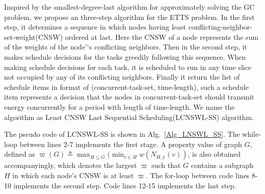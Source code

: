 \documentclass[journal,10pt]{IEEEtran}
\begin{document}
Inspired by the smallest-degree-last algorithm for approximately solving the GC problem, we propose an three-step algorithm for the ETTS problem. In the first step, it determines a sequence in which nodes having least conflicting-neighbor-set-weight(CNSW) ordered at last. Here the CNSW of a node represents the sum of the weights of the node'`s conflicting neighbors. Then in the second step, it makes schedule decisions for the tasks greedily following this sequence. When making schedule decisions for each task, it is scheduled to run in any time slice not occupied by any of its conflicting neighbors. Finally it return the list of schedule items in format of (concurrent-task-set, time-length), such a schedule item represents a decision that the nodes in concurrent-task-set should transmit energy concurrently for a period with length  of time-length. We name the algorithm as Least CNSW Last Sequential Scheduling(LCNSWL-SS) algorithm.

The pseudo code of LCNSWL-SS is shown in Alg.~\ref{Alg_LNSWL_SS}. The while-loop between lines 2-7 implements the first stage. A property value of graph $G$, defined as $\varpi(G){\triangleq}\max_{H{\subseteq}G}(\min_{v{\in}H}w(N_{H,\text{y}}(v))$, is also obtained accompanyingly, which denotes the largest $\varpi$ such that $G$ contains a subgraph $H$ in which each node's CNSW is at least $\varpi$. The for-loop between code lines 8-10 implements the second step. Code lines 12-15 implements the last step.
\end{document}
